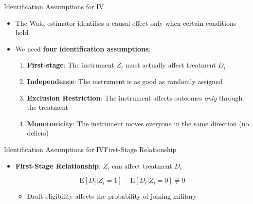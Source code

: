 \documentclass[dvipsnames,hyperref={pdfpagelabels=false}]{beamer}
\begin{document}
\begin{frame}{Identification Assumptions for IV}
	\begin{itemize}
		\item The Wald estimator identifies a causal effect only when certain conditions hold
		\vspace{0.2cm}
		\item We need \textbf{four identification assumptions}:
		\vspace{0.2cm}
		\begin{enumerate}
			\item \textbf{First-stage}: The instrument $Z_i$ must actually affect treatment $D_i$
			\vspace{0.2cm}
			\item \textbf{Independence}: The instrument is as good as randomly assigned
			\vspace{0.2cm}
			\item \textbf{Exclusion Restriction}: The instrument affects outcomes \emph{only} through the treatment
			\vspace{0.2cm}
			\item \textbf{Monotonicity}: The instrument moves everyone in the same direction (no defiers)
		\end{enumerate}
	\end{itemize}
\end{frame}



\begin{frame}{Identification Assumptions for IV}{First-Stage Relationship}
	\begin{itemize}
		
		\item \textbf{First-Stage Relationship}: $Z_{i}$ can affect treatment $D_{i}$
		
		\begin{equation*}
			\mathrm{E}[D_{i}|Z_{i}=1]-\mathrm{E}[D_{i}|Z_{i}=0] \neq 0
		\end{equation*}
		
			\begin{itemize}
		\vspace{0.2cm}
		\item Draft eligibility affects the probability of joining military
			\end{itemize}
	
		
	\end{itemize}
\end{frame}
\end{document}
